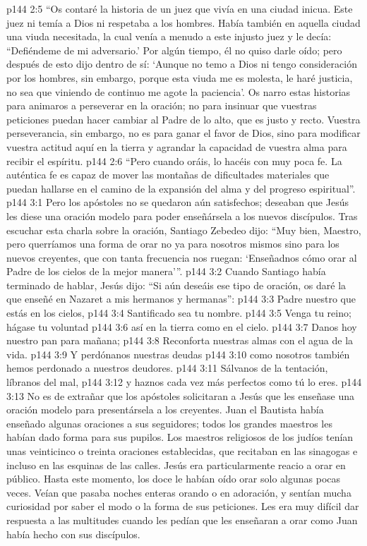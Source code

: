 \vs p144 2:5 “Os contaré la historia de un juez que vivía en una ciudad inicua. Este juez ni temía a Dios ni respetaba a los hombres. Había también en aquella ciudad una viuda necesitada, la cual venía a menudo a este injusto juez y le decía: “Defiéndeme de mi adversario.’ Por algún tiempo, él no quiso darle oído; pero después de esto dijo dentro de sí: ‘Aunque no temo a Dios ni tengo consideración por los hombres, sin embargo, porque esta viuda me es molesta, le haré justicia, no sea que viniendo de continuo me agote la paciencia’. Os narro estas historias para animaros a perseverar en la oración; no para insinuar que vuestras peticiones puedan hacer cambiar al Padre de lo alto, que es justo y recto. Vuestra perseverancia, sin embargo, no es para ganar el favor de Dios, sino para modificar vuestra actitud aquí en la tierra y agrandar la capacidad de vuestra alma para recibir el espíritu.
\vs p144 2:6 “Pero cuando oráis, lo hacéis con muy poca fe. La auténtica fe es capaz de mover las montañas de dificultades materiales que puedan hallarse en el camino de la expansión del alma y del progreso espiritual”.
\vs p144 3:1 Pero los apóstoles no se quedaron aún satisfechos; deseaban que Jesús les diese una oración modelo para poder enseñársela a los nuevos discípulos. Tras escuchar esta charla sobre la oración, Santiago Zebedeo dijo: “Muy bien, Maestro, pero querríamos una forma de orar no ya para nosotros mismos sino para los nuevos creyentes, que con tanta frecuencia nos ruegan: ‘Enseñadnos cómo orar al Padre de los cielos de la mejor manera’”.
\vs p144 3:2 Cuando Santiago había terminado de hablar, Jesús dijo: “Si aún deseáis ese tipo de oración, os daré la que enseñé en Nazaret a mis hermanos y hermanas”:
\vsetoff
\vs p144 3:3 Padre nuestro que estás en los cielos,
\vs p144 3:4 \hsetoff Santificado sea tu nombre.
\vs p144 3:5 Venga tu reino; hágase tu voluntad
\vs p144 3:6 \hsetoff así en la tierra como en el cielo.
\vs p144 3:7 Danos hoy nuestro pan para mañana;
\vs p144 3:8 \hsetoff Reconforta nuestras almas con el agua de la vida.
\vs p144 3:9 Y perdónanos nuestras deudas
\vs p144 3:10 \hsetoff como nosotros también hemos perdonado a nuestros deudores.
\vs p144 3:11 Sálvanos de la tentación, líbranos del mal,
\vs p144 3:12 \hsetoff y haznos cada vez más perfectos como tú lo eres.
\vsetoff
\vs p144 3:13 No es de extrañar que los apóstoles solicitaran a Jesús que les enseñase una oración modelo para presentársela a los creyentes. Juan el Bautista había enseñado algunas oraciones a sus seguidores; todos los grandes maestros les habían dado forma para sus pupilos. Los maestros religiosos de los judíos tenían unas veinticinco o treinta oraciones establecidas, que recitaban en las sinagogas e incluso en las esquinas de las calles. Jesús era particularmente reacio a orar en público. Hasta este momento, los doce le habían oído orar solo algunas pocas veces. Veían que pasaba noches enteras orando o en adoración, y sentían mucha curiosidad por saber el modo o la forma de sus peticiones. Les era muy difícil dar respuesta a las multitudes cuando les pedían que les enseñaran a orar como Juan había hecho con sus discípulos.
